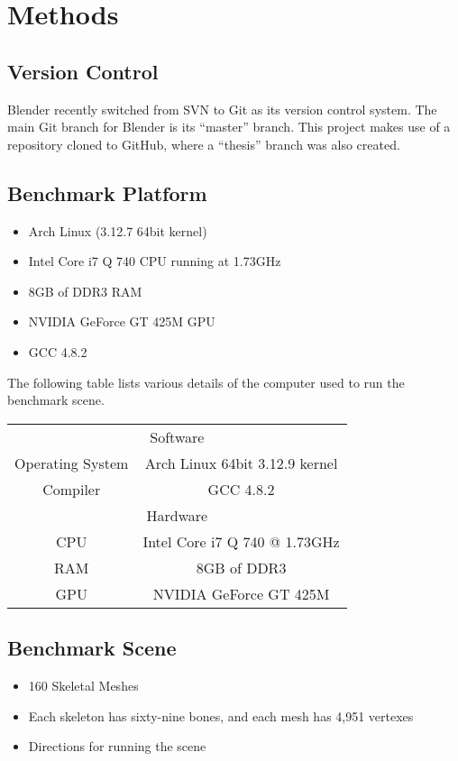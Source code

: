 \section{Methods}

\subsection{Version Control}
Blender recently switched from SVN\cite{svn} to Git\cite{git} as its version control system\cite{blendergit}.
The main Git branch for Blender is its ``master'' branch.
This project makes use of a repository cloned to GitHub\cite{github}, where a ``thesis'' branch was also created.

\subsection{Benchmark Platform}
\label{sec:bench_platform}
\ifsummaries
\begin{itemize}
 \item Arch Linux (3.12.7 64bit kernel)
 \item Intel Core i7 Q 740 CPU running at 1.73GHz
 \item 8GB of DDR3 RAM
 \item NVIDIA GeForce GT 425M GPU
 \item GCC 4.8.2
\end{itemize}
\fi

The following table lists various details of the computer used to run the benchmark scene.

\smallskip

\begin{center}
\begin{tabular}{cc}
 \hline
 \multicolumn{2}{c}{\cellcolor[gray]{0.8}Software} \\
 Operating System & Arch Linux 64bit 3.12.9 kernel \\
 Compiler & GCC 4.8.2 \\
 \multicolumn{2}{c}{\cellcolor[gray]{0.8}Hardware} \\
 CPU & Intel Core i7 Q 740 @ 1.73GHz \\
 RAM & 8GB of DDR3 \\
 GPU & NVIDIA GeForce GT 425M \\
 \hline
\end{tabular}
\end{center}

\subsection{Benchmark Scene}
\label{sec:bench_scene}
\ifsummaries
\begin{itemize}
 \item 160 Skeletal Meshes
 \item Each skeleton has sixty-nine bones, and each mesh has 4,951 vertexes
 \item Directions for running the scene
\end{itemize}
\fi

